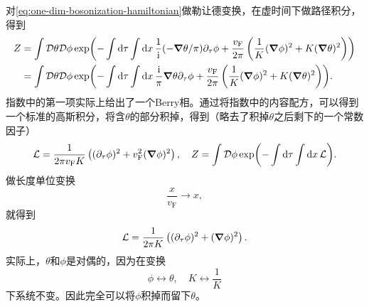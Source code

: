 对\eqref{eq:one-dim-bosonization-hamiltonian}做勒让德变换，在虚时间下做路径积分，得到
\[
    \begin{aligned}
        Z &= \int \mathcal{D} \theta \mathcal{D} \phi \exp(- \int \dd{\tau} \int \dd{x} \frac{1}{\mathrm{i}} (- \grad{\theta} / \pi) \partial_\tau \phi + \frac{v_\text{F}}{2\pi} \left( \frac{1}{K} (\grad{\phi})^2 + K (\grad{\theta})^2 \right) ) \\
        &= \int \mathcal{D} \theta \mathcal{D} \phi \exp(- \int \dd{\tau} \int \dd{x} \frac{\mathrm{i}}{\pi} \grad{\theta} \partial_\tau \phi + \frac{v_\text{F}}{2\pi} \left( \frac{1}{K} (\grad{\phi})^2 + K (\grad{\theta})^2 \right) ).
    \end{aligned}
\]
指数中的第一项实际上给出了一个Berry相。通过将指数中的内容配方，可以得到一个标准的高斯积分，将含$\theta$的部分积掉，得到（略去了积掉$\theta$之后剩下的一个常数因子）
\begin{equation}
    \mathcal{L} = \frac{1}{2\pi v_\text{F} K} \left( (\partial_\tau \phi)^2 + v_\text{F}^2 (\grad{\phi})^2 \right) , \quad Z = \int \mathcal{D} \phi \exp(- \int \dd{\tau} \int \dd{x} \mathcal{L} ).
\end{equation}
做长度单位变换
\[
    \frac{x}{v_\text{F}} \longrightarrow x,
\]
就得到
\begin{equation}
    \mathcal{L} = \frac{1}{2\pi K} \left( (\partial_\tau \phi)^2 + (\grad{\phi})^2 \right).
    \label{eq:one-dim-scaleless-lag}
\end{equation}
实际上，$\theta$和$\phi$是对偶的，因为在变换
\[
    \phi \longleftrightarrow \theta, \quad K \longleftrightarrow \frac{1}{K}
\]
下系统不变。因此完全可以将$\phi$积掉而留下$\theta$。

